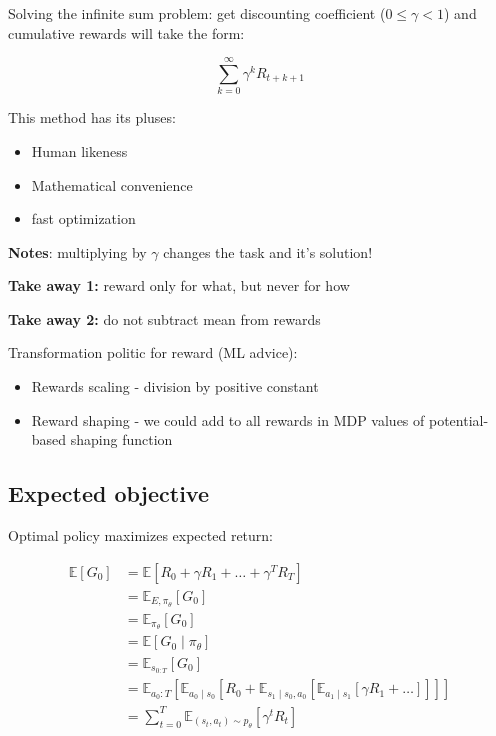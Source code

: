 \documentclass[a4paper,12pt]{article}
\begin{document}
	Solving the infinite sum problem: get discounting coefficient ($0 \leq \gamma<1$) and cumulative rewards will take the form:
	
	
	$$\sum_{k=0}^{\infty} \gamma^k R_{t+k+1}$$
	
	This method has its pluses:
	
	\begin{itemize}
		\item Human likeness
		\item Mathematical convenience 
		\item fast optimization 
	\end{itemize}
	
	\textbf{Notes}: multiplying by $\gamma$ changes the task and it's solution!
	 
	
	\textbf{Take away 1:} reward only for what, but never for how
	
	\textbf{Take away 2:} do not subtract mean from rewards
	
	
	Transformation politic for reward (ML advice):
	
	\begin{itemize}
		\item Rewards scaling - division by positive constant
		\item Reward shaping - we could add to all rewards in MDP values of potential-based shaping function 
	\end{itemize}   

	\subsection{Expected objective}
	
	Optimal policy maximizes expected return: 
	
	$$\begin{aligned} \mathbb{E}\left[G_0\right] & =\mathbb{E}\left[R_0+\gamma R_1+\ldots+\gamma^T R_T\right] \\ & =\mathbb{E}_{E, \pi_\theta}\left[G_0\right] \\ & =\mathbb{E}_{\pi_\theta}\left[G_0\right] \\ & =\mathbb{E}\left[G_0 \mid \pi_\theta\right] \\ & =\mathbb{E}_{s_{0: T}}\left[G_0\right] \\ & =\mathbb{E}_{a_0: T}\left[\mathbb{E}_{a_0 \mid s_0}\left[R_0+\mathbb{E}_{s_1 \mid s_0, a_0}\left[\mathbb{E}_{a_1 \mid s_1}\left[\gamma R_1+\ldots\right]\right]\right]\right] \\ & =\sum_{t=0}^T \mathbb{E}_{\left(s_t, a_t\right) \sim p_\theta}\left[\gamma^t R_t\right]\end{aligned}$$
	
\end{document}
